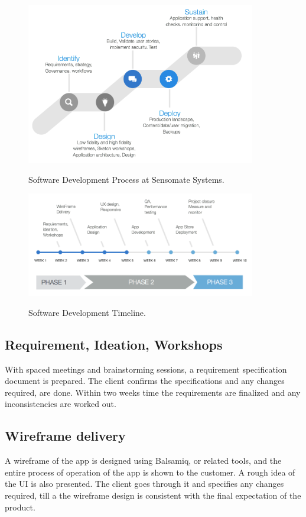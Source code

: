 \documentclass[a4paper,12pt]{report}
\begin{document}
			\begin{figure}[H]
				\begin{centering}
					\includegraphics[width=10cm]{images/process.png}\\
					\caption{Software Development Process at Sensomate Systems.}
				\end{centering}
			\end{figure}

			\begin{figure}[H]
				\begin{centering}
					\includegraphics[width=10cm]{images/timeline.png}\\
					\caption{Software Development Timeline.}
				\end{centering}
			\end{figure}


			\subsection{Requirement, Ideation, Workshops}
				With spaced meetings and brainstorming sessions, a requirement specification document is prepared. The client confirms the specifications and any changes required, are done.
				Within two weeks time the requirements are finalized and any inconsistencies are worked out. 
			\subsection{Wireframe delivery}
				A wireframe of the app is designed using Balsamiq, or related tools, and the entire process of operation of the app is shown to the customer. A rough idea of the UI is also presented. The client goes through it and specifies any changes required, till a the wireframe design is consistent with the final expectation of the product.
\end{document}
